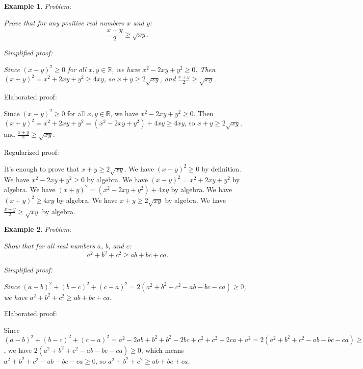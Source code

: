 \documentclass{article}
\newtheorem{example}{Example}
\begin{document}
\begin{example}
Problem:
\begin{tcolorbox}[colback=yellow!10, width=\linewidth]
Prove that for any positive real numbers $x$ and $y$:
    $$\frac{x+y}{2} \geq \sqrt{xy}.$$
\end{tcolorbox}

Simplified proof:
\begin{tcolorbox}[colback=blue!10, width=\linewidth]
Since $(x-y)^2 \ge 0$ for all $x, y \in \mathbb{R}$, we have $x^2 - 2xy + y^2 \ge 0$. Then $(x+y)^2 = x^2 + 2xy + y^2 \ge 4xy$, so $x+y \ge 2\sqrt{xy}$, and $\frac{x+y}{2} \ge \sqrt{xy}$.
\end{tcolorbox}
\end{example}

Elaborated proof:
\begin{tcolorbox}[colback=green!10, width=\linewidth]
Since $(x-y)^2 \ge 0$ for all $x, y \in \mathbb{R}$, we have $x^2 - 2xy + y^2 \ge 0$. Then $(x+y)^2 = x^2 + 2xy + y^2 = (x^2 - 2xy + y^2) + 4xy \ge 4xy$, so $x+y \ge 2\sqrt{xy}$, and $\frac{x+y}{2} \ge \sqrt{xy}$.
\end{tcolorbox}

Regularized proof:
\begin{tcolorbox}[colback=red!10, width=\linewidth]
It's enough to prove that $x+y \ge 2\sqrt{xy}$. We have $(x-y)^2 \ge 0$ by definition. We have $x^2 - 2xy + y^2 \ge 0$ by algebra. We have $(x+y)^2 = x^2 + 2xy + y^2$ by algebra. We have $(x+y)^2 = (x^2 - 2xy + y^2) + 4xy$ by algebra. We have $(x+y)^2 \ge 4xy$ by algebra. We have $x+y \ge 2\sqrt{xy}$ by algebra. We have $\frac{x+y}{2} \ge \sqrt{xy}$ by algebra.
\end{tcolorbox}



\begin{example}
Problem:
\begin{tcolorbox}[colback=yellow!10, width=\linewidth]
Show that for all real numbers $a$, $b$, and $c$:
    $$a^2 + b^2 + c^2 \geq ab + bc + ca.$$
\end{tcolorbox}

Simplified proof:
\begin{tcolorbox}[colback=blue!10, width=\linewidth]
Since $(a-b)^2+(b-c)^2+(c-a)^2 = 2(a^2+b^2+c^2-ab-bc-ca) \ge 0$, we have $a^2+b^2+c^2 \ge ab+bc+ca$.
\end{tcolorbox}
\end{example}

Elaborated proof:
\begin{tcolorbox}[colback=green!10, width=\linewidth]
Since $(a-b)^2+(b-c)^2+(c-a)^2 = a^2 - 2ab + b^2 + b^2 - 2bc + c^2 + c^2 - 2ca + a^2 = 2(a^2+b^2+c^2-ab-bc-ca) \ge 0$, we have $2(a^2+b^2+c^2-ab-bc-ca) \ge 0$, which means $a^2+b^2+c^2-ab-bc-ca \ge 0$, so $a^2+b^2+c^2 \ge ab+bc+ca$.
\end{tcolorbox}
\end{document}
